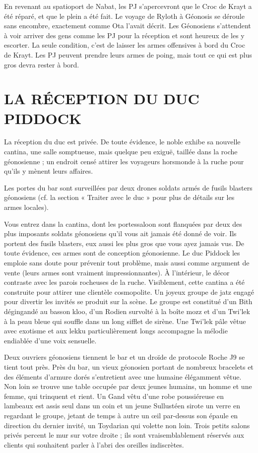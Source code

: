 \documentclass[a4paper,10pt,twoside,twocolumn,openany]{book}
\begin{document}
En revenant au spatioport de Nabat, les PJ s’apercevront que le Croc de Krayt a été réparé, et que le plein a
été fait. Le voyage de Ryloth à Géonosis se déroule sans
encombre, exactement comme Ota l’avait décrit. Les
Géonosiens s’attendent à voir arriver des gens comme
les PJ pour la réception et sont heureux de les y escorter.
La seule condition, c’est de laisser les armes offensives
à bord du Croc de Krayt. Les PJ peuvent prendre leurs
armes de poing, mais tout ce qui est plus gros devra rester à bord.

\section{LA RÉCEPTION
DU DUC PIDDOCK}
La réception du duc est privée. De toute évidence, le
noble exhibe sa nouvelle cantina, une salle somptueuse,
mais quelque peu exiguë, taillée dans la roche géonosienne ; un endroit censé attirer les voyageurs horsmonde à la ruche pour qu’ils y mènent leurs affaires.

Les portes du bar sont surveillées par deux drones
soldats armés de fusils blasters géonosiens (cf. la section « Traiter avec le duc » pour plus de détails sur les
armes locales).

\begin{quotebox}
Vous entrez dans la cantina, dont les portessaloon sont flanquées par deux des plus imposants soldats géonosiens qu’il vous ait jamais été
donné de voir. Ils portent des fusils blasters, eux
aussi les plus gros que vous ayez jamais vus. De
toute évidence, ces armes sont de conception géonosienne. Le duc Piddock les emploie sans doute
pour prévenir tout problème, mais aussi comme
argument de vente (leurs armes sont vraiment impressionnantes). À l’intérieur, le décor contraste
avec les parois rocheuses de la ruche. Visiblement,
cette cantina a été construite pour attirer une
clientèle cosmopolite. Un joyeux groupe de jatz
engagé pour divertir les invités se produit sur la
scène. Le groupe est constitué d’un Bith dégingandé au basson kloo, d’un Rodien survolté à la boîte
mozz et d’un Twi’lek à la peau bleue qui souffle
dans un long sifflet de sirène. Une Twi’lek pâle vêtue avec exotisme et aux lekku particulièrement
longs accompagne la mélodie endiablée d’une
voix sensuelle.

Deux ouvriers géonosiens tiennent le bar et un
droïde de protocole Roche J9 se tient tout près.
Près du bar, un vieux géonosien portant de nombreux bracelets et des éléments d’armure dorés
s’entretient avec une humaine élégamment vêtue.
Non loin se trouve une table occupée par deux
jeunes humains, un homme et une femme, qui
trinquent et rient. Un Gand vêtu d’une robe poussiéreuse en lambeaux est assis seul dans un coin
et un jeune Sullustéen sirote un verre en regardant
le groupe, jetant de temps à autre un œil par-dessus son épaule en direction du dernier invité, un
Toydarian qui volette non loin. Trois petits salons
privés percent le mur sur votre droite ; ils sont vraisemblablement réservés aux clients qui souhaitent
parler à l’abri des oreilles indiscrètes.
\end{quotebox}
\end{document}
